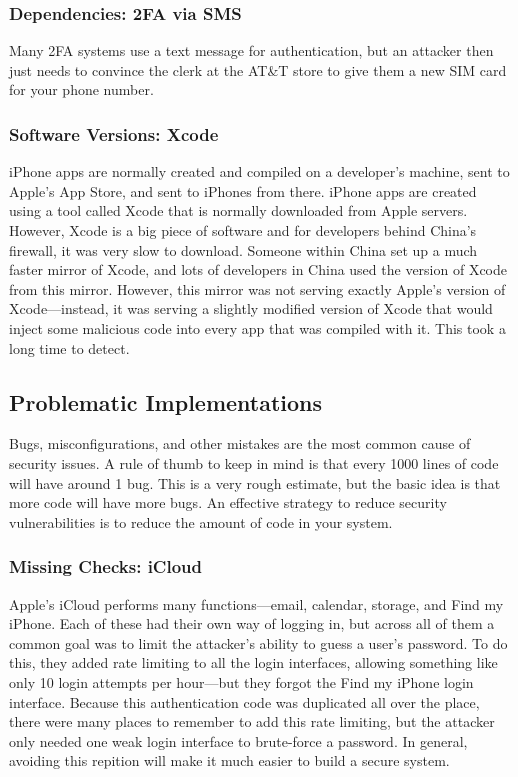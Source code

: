 \subsubsection{Dependencies: 2FA via SMS}
Many 2FA systems use a text message for authentication, but an attacker then just needs to convince the clerk at the AT\&T store to give them a new SIM card for your phone number.

\subsubsection{Software Versions: Xcode}
iPhone apps are normally created and compiled on a developer's machine, sent to Apple's App Store, and sent to iPhones from there. iPhone apps are created using a tool called Xcode that is normally downloaded from Apple servers. However, Xcode is a big piece of software and for developers behind China's firewall, it was very slow to download. Someone within China set up a much faster mirror of Xcode, and lots of developers in China used the version of Xcode from this mirror. However, this mirror was not serving exactly Apple's version of Xcode---instead, it was serving a slightly modified version of Xcode that would inject some malicious code into every app that was compiled with it. This took a long time to detect. 

\subsection{Problematic Implementations}
Bugs, misconfigurations, and other mistakes are the most common cause of security issues. A rule of thumb to keep in mind is that every 1000 lines of code will have around 1 bug. This is a very rough estimate, but the basic idea is that more code will have more bugs. An effective strategy to reduce security vulnerabilities is to reduce the amount of code in your system.

\subsubsection{Missing Checks: iCloud}
Apple's iCloud performs many functions---email, calendar, storage, and Find my iPhone. Each of these had their own way of logging in, but across all of them a common goal was to limit the attacker's ability to guess a user's password. To do this, they added rate limiting to all the login interfaces, allowing something like only 10 login attempts per hour---but they forgot the Find my iPhone login interface. Because this authentication code was duplicated all over the place, there were many places to remember to add this rate limiting, but the attacker only needed one weak login interface to brute-force a password. In general, avoiding this repition will make it much easier to build a secure system.

